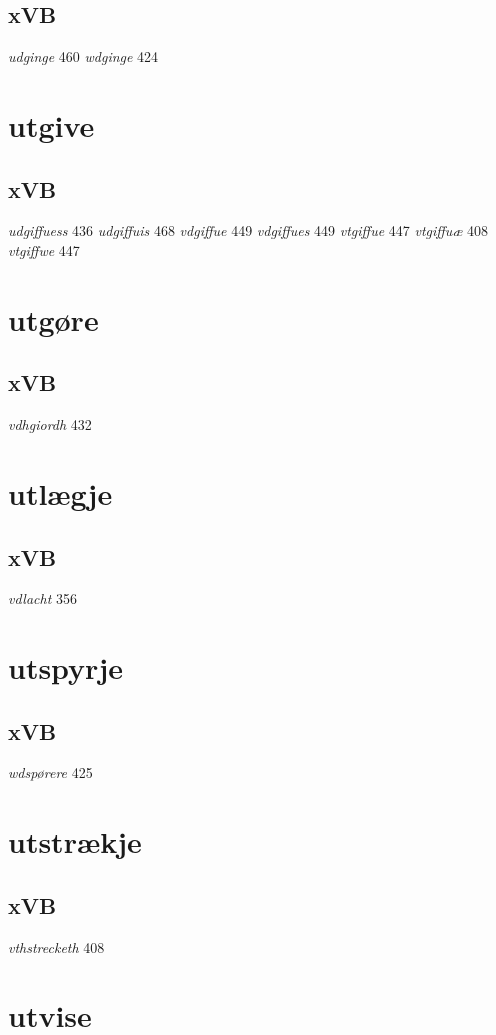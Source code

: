 \documentclass[a4paper,twocolumn]{article}
\begin{document}
\subsection{xVB}
\label{sec:org334ab60}
\emph{udginge} 460 \emph{wdginge} 424 
\section{utgive}
\label{sec:orgb9550ef}
\subsection{xVB}
\label{sec:org17dbd86}
\emph{udgiffuess} 436 \emph{udgiffuis} 468 \emph{vdgiffue} 449 \emph{vdgiffues} 449 \emph{vtgiffue} 447 \emph{vtgiffuæ} 408 \emph{vtgiffwe} 447 
\section{utgøre}
\label{sec:org1814f0e}
\subsection{xVB}
\label{sec:org17b1a00}
\emph{vdhgiordh} 432 
\section{utlægje}
\label{sec:orgb528e30}
\subsection{xVB}
\label{sec:org4c5a31f}
\emph{vdlacht} 356 
\section{utspyrje}
\label{sec:org03ce6f4}
\subsection{xVB}
\label{sec:org7e2c3e1}
\emph{wdspørere} 425 
\section{utstrækje}
\label{sec:orgce24530}
\subsection{xVB}
\label{sec:orgb2e5dc4}
\emph{vthstrecketh} 408 
\section{utvise}
\label{sec:orga9d73e8}
\end{document}
